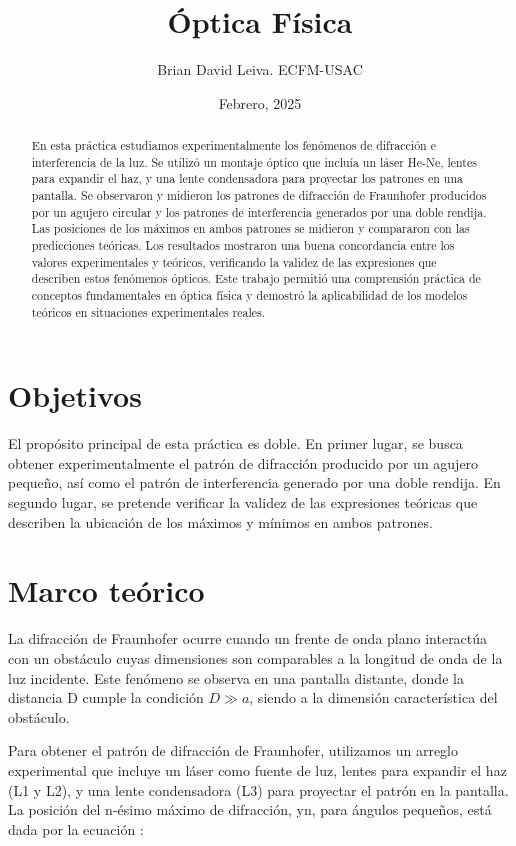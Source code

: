 \documentclass[twocolumn,a4paper,11pt]{scrartcl}
\title{Óptica Física}
\author{Brian David Leiva. ECFM-USAC}
\date{Febrero, 2025}
\begin{document}
\maketitle

\begin{abstract}
En esta práctica estudiamos experimentalmente los fenómenos de difracción e interferencia de la luz. Se utilizó un montaje óptico que incluía un láser He-Ne, lentes para expandir el haz, y una lente condensadora para proyectar los patrones en una pantalla. Se observaron y midieron los patrones de difracción de Fraunhofer producidos por un agujero circular y los patrones de interferencia generados por una doble rendija. Las posiciones de los máximos en ambos patrones se midieron y compararon con las predicciones teóricas. Los resultados mostraron una buena concordancia entre los valores experimentales y teóricos, verificando la validez de las expresiones que describen estos fenómenos ópticos. Este trabajo permitió una comprensión práctica de conceptos fundamentales en óptica física y demostró la aplicabilidad de los modelos teóricos en situaciones experimentales reales.
\end{abstract}

\section{Objetivos}
El propósito principal de esta práctica es doble. En primer lugar, se busca obtener experimentalmente el patrón de difracción producido por un agujero pequeño, así como el patrón de interferencia generado por una doble rendija. En segundo lugar, se pretende verificar la validez de las expresiones teóricas que describen la ubicación de los máximos y mínimos en ambos patrones.

\section{Marco teórico}

La difracción de Fraunhofer ocurre cuando un frente de onda plano interactúa con un obstáculo cuyas dimensiones son comparables a la longitud de onda de la luz incidente. Este fenómeno se observa en una pantalla distante, donde la distancia D cumple la condición $D \gg a$, siendo a la dimensión característica del obstáculo.

Para obtener el patrón de difracción de Fraunhofer, utilizamos un arreglo experimental que incluye un láser como fuente de luz, lentes para expandir el haz (L1 y L2), y una lente condensadora (L3) para proyectar el patrón en la pantalla. La posición del n-ésimo máximo de difracción, yn, para ángulos pequeños, está dada por la ecuación \cite{serway}:
\end{document}
